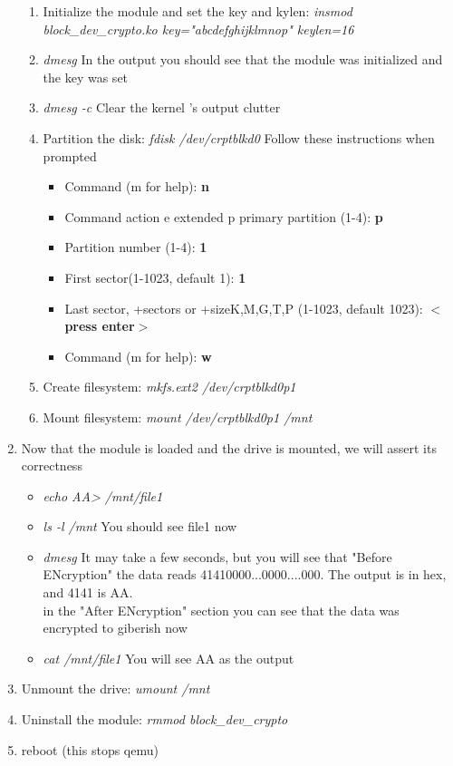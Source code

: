 \documentclass[draftclsnofoot, onecolumn, 10pt, compsoc]{IEEEtran}
\begin{document}
\begin{enumerate}
\begin{enumerate}
					\item Initialize the module and set the key and kylen: \textit{insmod block\_dev\_crypto.ko key="abcdefghijklmnop" keylen=16}
					\item \textit{dmesg} In the output you should see that the module was initialized and the key was set
					\item \textit{dmesg -c} Clear the kernel 's output clutter
					\item Partition the disk:\textit{ fdisk /dev/crptblkd0}
						Follow these instructions when prompted
						\begin{itemize}
							\item Command (m for help): \textbf{n}
							\item Command action
   e extended
   p primary partition (1-4):
\textbf{p}
							\item Partition number (1-4): \textbf{1}
							\item First sector(1-1023, default 1): \textbf{1}
							\item Last sector, +sectors or +size{K,M,G,T,P} (1-1023, default 1023): \textbf{$<$press enter$>$}
							\item Command (m for help): \textbf{w}
						\end{itemize}
					\item Create filesystem: \textit{mkfs.ext2 /dev/crptblkd0p1}
					\item Mount filesystem: \textit{mount /dev/crptblkd0p1 /mnt}
				\end{enumerate}
				\item Now that the module is loaded and the drive is mounted, we will assert its correctness
				\begin{itemize}
					\item \textit{echo AA> /mnt/file1}
					\item \textit{ls -l /mnt} You should see file1 now
					\item \textit{dmesg} It may take a few seconds, but you will see that "Before ENcryption" the data reads 41410000...0000....000. The output is in hex, and 4141 is AA. \\
					in the "After ENcryption" section you can see that the data was encrypted to giberish now
					\item \textit{cat /mnt/file1} You will see AA as the output
				\end{itemize}
				\item Unmount the drive: \textit{umount /mnt}
				\item Uninstall the module: \textit{rmmod block\_dev\_crypto}
				\item reboot (this stops qemu)
			\end{enumerate}
\end{document}
